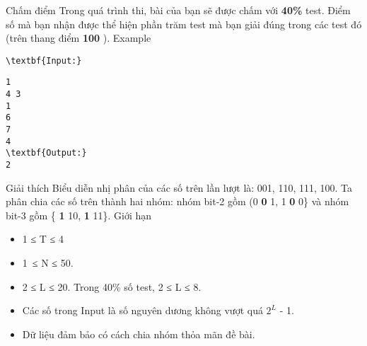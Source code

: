 Chấm điểm  
Trong quá trình thi, bài của bạn sẽ được chấm với   \textbf{    40\%   }   test. Điểm số mà bạn nhận được thể hiện phần trăm test mà bạn giải đúng trong các test đó (trên thang điểm   \textbf{    100   }   ).
   Example  
\begin{verbatim}
\textbf{Input:}\end{verbatim}
\begin{verbatim}
1
4 3
1
6
7
4
\textbf{Output:}
2
\end{verbatim}
   Giải thích  
Biểu diễn nhị phân của các số trên lần lượt là: 001, 110, 111, 100. Ta phân chia các số trên thành hai nhóm: nhóm bit-2 gồm (0   \textbf{    0   }   1, 1   \textbf{    0   }   0\} và nhóm bit-3 gồm \{   \textbf{    1   }   10,   \textbf{    1   }   11\}.
   Giới hạn  
\begin{itemize}
	\item     1 ≤ T ≤ 4   
	\item     1 ≤ N ≤ 50.   
	\item     2 ≤ L ≤ 20. Trong 40\% số test, 2 ≤ L ≤ 8.   
	\item     Các số trong Input là số nguyên dương không vượt quá $2^{L}$    - 1.   
	\item     Dữ liệu đảm bảo có cách chia nhóm thỏa mãn đề bài.   
\end{itemize}